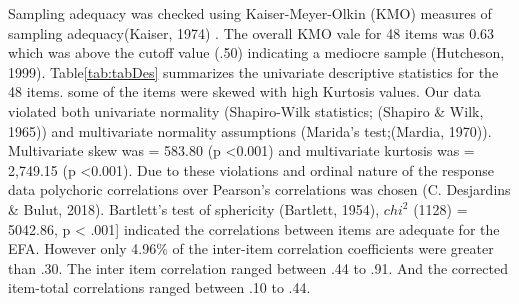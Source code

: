 \documentclass[
  english,
  man]{apa6}
\begin{document}
Sampling adequacy was checked using Kaiser-Meyer-Olkin (KMO) measures of sampling adequacy(Kaiser, 1974) . The overall KMO vale for 48 items was 0.63 which was above the cutoff value (.50) indicating a mediocre sample (Hutcheson, 1999). Table\ref{tab:tabDes} summarizes the univariate descriptive statistics for the 48 items. some of the items were skewed with high Kurtosis values. Our data violated both univariate normality (Shapiro-Wilk statistics; (Shapiro \& Wilk, 1965)) and multivariate normality assumptions (Marida's test;(Mardia, 1970)). Multivariate skew was = 583.80 (p \textless0.001) and multivariate kurtosis was = 2,749.15 (p \textless0.001). Due to these violations and ordinal nature of the response data polychoric correlations over Pearson's correlations was chosen (C. Desjardins \& Bulut, 2018). Bartlett's test of sphericity (Bartlett, 1954), \(chi^2\) (1128) = 5042.86, p \textless{} .001{]} indicated the correlations between items are adequate for the EFA. However only 4.96\% of the inter-item correlation coefficients were greater than .30. The inter item correlation ranged between .44 to .91. And the corrected item-total correlations ranged between .10 to .44.
\end{document}
